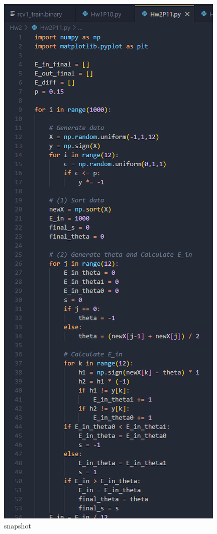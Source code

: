 \documentclass[12pt,a4paper]{article}
\begin{document}
\begin{figure}[hbp]
    \includegraphics[height = 0.4\textheight]{Hw2P11 snapshot.png}
    \caption{snapshot}
\end{figure}

\newpage
\end{document}
